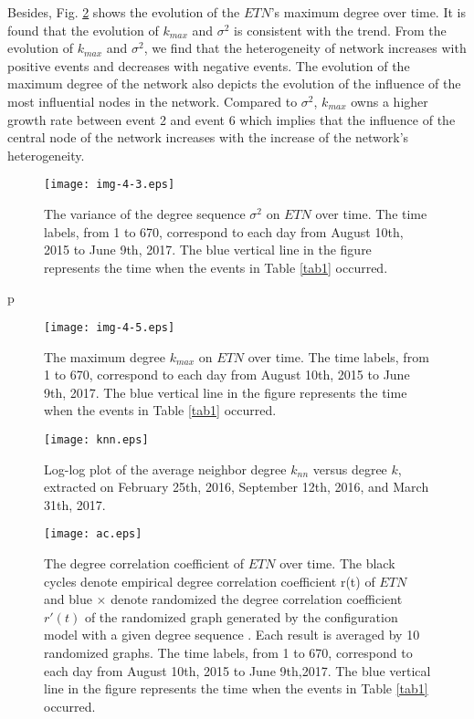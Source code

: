\documentclass[conference]{IEEEtran}
\begin{document}
\begin{CJK*}{UTF8}{gbsn}
Besides, Fig. \ref{fig5} shows the evolution of the $ETN$'s maximum degree over time. It is found that the evolution of $k_{max}$ and $\sigma^2$ is consistent with the trend. From the evolution of $k_{max}$ and $\sigma^2$, we find that the heterogeneity of network increases with positive events and decreases with negative events. The evolution of the maximum degree of the network also depicts the evolution of the influence of the most influential nodes in the network. Compared to $\sigma^2$, $k_{max}$ owns a higher growth rate between event 2 and event 6 which implies that the influence of the central node of the network increases with the increase of the network's heterogeneity.


\begin{figure}[htbp]
\centering
\texttt{[image: img-4-3.eps]}
\caption{The variance of the degree sequence $\sigma^2$ on $ETN$ over time. The time labels, from 1 to 670, correspond to each day from August 10th, 2015 to June 9th, 2017. The blue vertical line in the figure represents the time when the events in Table \ref{tab1} occurred.}
\label{fig4}
\end{figure}p

\begin{figure}[htbp]
\centering
\texttt{[image: img-4-5.eps]}
\caption{The maximum degree $k_{max}$ on $ETN$ over time. The time labels, from 1 to 670, correspond to each day from August 10th, 2015 to June 9th, 2017. The blue vertical line in the figure represents the time when the events in Table \ref{tab1} occurred.}
\label{fig5}
\end{figure}


\begin{figure}[htbp]
\centering
\texttt{[image: knn.eps]}
\caption{Log-log plot of the average neighbor degree $k_{nn}$ versus degree $k$, extracted on February 25th, 2016, September 12th, 2016, and March 31th, 2017. }
\label{fig6}
\end{figure}

\begin{figure}[htbp]
\centering
\texttt{[image: ac.eps]}
\caption{The degree correlation coefficient of $ETN$ over time. The black cycles denote empirical degree correlation coefficient r(t) of $ETN$ and blue $\times$ denote randomized the degree correlation coefficient $r'(t)$ of the randomized graph generated by the configuration model with a given degree sequence \cite{newman2003structure}. Each result is averaged by 10 randomized graphs. The time labels, from 1 to 670, correspond to each day from August 10th, 2015 to June 9th,2017. The blue vertical line in the figure represents the time when the events in Table \ref{tab1} occurred.}
\label{fig7}
\end{figure}


\end{CJK*}
\end{document}
